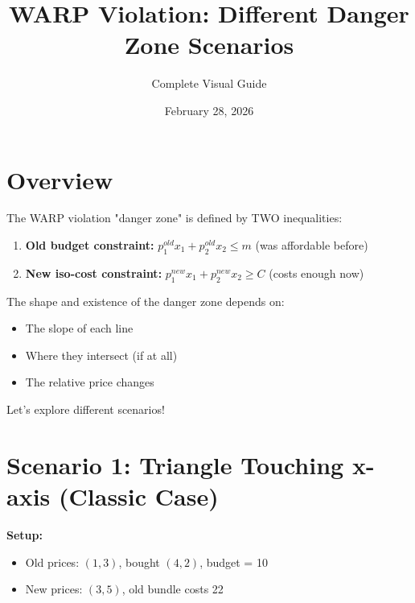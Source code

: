 \documentclass[11pt]{article}
\title{WARP Violation: Different Danger Zone Scenarios}
\author{Complete Visual Guide}
\date{February 28, 2026}
\begin{document}
\maketitle

\section{Overview}

The WARP violation "danger zone" is defined by TWO inequalities:
\begin{enumerate}
\item \textbf{Old budget constraint:} $p_1^{old} x_1 + p_2^{old} x_2 \leq m$ (was affordable before)
\item \textbf{New iso-cost constraint:} $p_1^{new} x_1 + p_2^{new} x_2 \geq C$ (costs enough now)
\end{enumerate}

The shape and existence of the danger zone depends on:
\begin{itemize}
\item The slope of each line
\item Where they intersect (if at all)
\item The relative price changes
\end{itemize}

Let's explore different scenarios!

\newpage

\section{Scenario 1: Triangle Touching x-axis (Classic Case)}

\textbf{Setup:}
\begin{itemize}
\item Old prices: $(1, 3)$, bought $(4, 2)$, budget = 10
\item New prices: $(3, 5)$, old bundle costs 22
\end{itemize}
\end{document}
